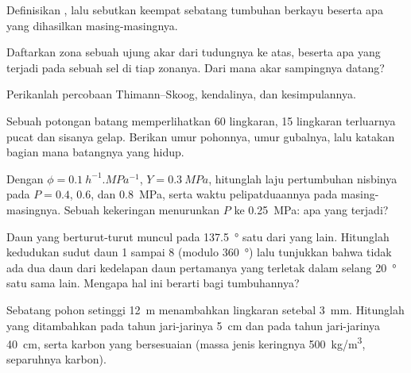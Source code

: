 \begin{exercise}[$\star$]\label{exo:b2:plant-meristems:1}
Definisikan , lalu sebutkan keempat  sebatang tumbuhan
berkayu beserta apa yang dihasilkan masing-masingnya.
\end{exercise}

\begin{exercise}[$\star$]\label{exo:b2:plant-meristems:2}
Daftarkan zona sebuah ujung akar dari tudungnya ke atas, beserta apa
yang terjadi pada sebuah sel di tiap zonanya. Dari mana akar sampingnya
datang?
\end{exercise}

\begin{exercise}[$\star$]\label{exo:b2:plant-meristems:3}
Perikanlah percobaan Thimann--Skoog, kendalinya, dan kesimpulannya.
\end{exercise}

\begin{exercise}[$\star$]\label{exo:b2:plant-meristems:4}
Sebuah potongan batang memperlihatkan 60 lingkaran, 15 lingkaran
terluarnya pucat dan sisanya gelap. Berikan umur pohonnya, umur 
gubalnya, lalu katakan bagian mana batangnya yang hidup.
\end{exercise}

\begin{exercise}[$\star\star$]\label{exo:b2:plant-meristems:5}
Dengan $\phi = \qty{0.1}{h^{-1}.MPa^{-1}}$, $Y = \qty{0.3}{MPa}$,
hitunglah laju pertumbuhan nisbinya pada $P = 0.4$, $0.6$, dan
\qty{0.8}{MPa}, serta waktu pelipatduaannya pada masing-masingnya.
Sebuah kekeringan menurunkan $P$ ke \qty{0.25}{MPa}: apa yang terjadi?
\end{exercise}

\begin{exercise}[$\star\star$]\label{exo:b2:plant-meristems:6}
Daun yang berturut-turut muncul pada \qty{137.5}{\degree} satu dari
yang lain. Hitunglah kedudukan sudut daun 1 sampai 8 (modulo
\qty{360}{\degree}) lalu tunjukkan bahwa tidak ada dua daun dari
kedelapan daun pertamanya yang terletak dalam selang
\qty{20}{\degree} satu sama lain. Mengapa hal ini berarti bagi
tumbuhannya?
\end{exercise}

\begin{exercise}[$\star\star$]\label{exo:b2:plant-meristems:7}
Sebatang pohon setinggi \qty{12}{m} menambahkan lingkaran setebal
\qty{3}{mm}. Hitunglah  yang ditambahkan pada tahun jari-jarinya
\qty{5}{cm} dan pada tahun jari-jarinya \qty{40}{cm}, serta karbon yang
bersesuaian (massa jenis keringnya \qty{500}{kg/m^3}, separuhnya karbon).
\end{exercise}

